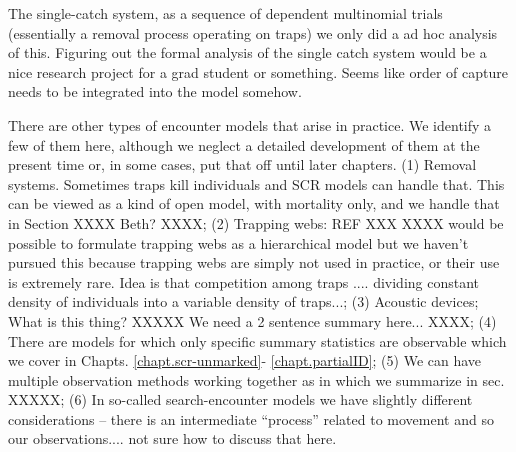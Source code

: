 The single-catch system, as a sequence of dependent multinomial trials
(essentially a removal process operating on traps) we only did a ad
hoc analysis of this.
Figuring out the formal analysis of the single catch system would be
a nice research project for a grad student or something.
Seems like order of capture needs to be integrated into the model somehow.

There are other types of encounter models that arise in
practice. We identify a few of them here, although we neglect a
detailed development of them at the present time or, in some cases, put that off until
later chapters.
(1) Removal systems. Sometimes traps kill individuals and SCR models can handle
that. This can be viewed as a kind of open model, with mortality only, and we handle that
in Section XXXX Beth? XXXX;
(2) Trapping webs: REF XXX XXXX
would be possible to formulate trapping webs as a hierarchical model
but we haven't pursued this because trapping webs are simply not used
in practice, or their use is extremely rare.  Idea is that competition
among traps .... dividing constant density of individuals into a
variable density of traps...;
(3) Acoustic devices; What is this thing? XXXXX We need a 2 sentence
summary here... XXXX;
(4)
There are models for which
only specific summary statistics are observable
\citep{chandler_royle:2012}
which we cover in Chapts. \ref{chapt.scr-unmarked}-
\ref{chapt.partialID};
(5) We can have multiple observation methods working together as in
\citet{gopalaswamy_etal:2012} which we summarize in sec. XXXXX;
(6) In so-called search-encounter models we have slightly different
considerations -- there is an intermediate ``process'' related to
movement and so our observations.... not sure how to discuss that here.



